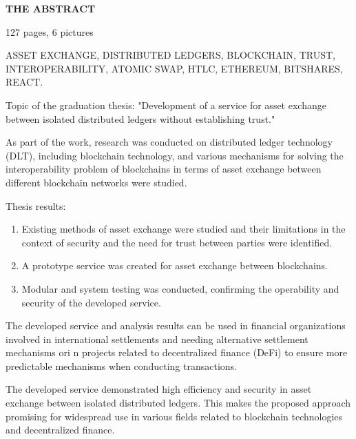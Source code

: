 \begin{center}
\textbf{THE ABSTRACT}
\end{center}
\vspace{4pt}

127 pages, 6 pictures

\noindent ASSET EXCHANGE, DISTRIBUTED LEDGERS, BLOCKCHAIN, TRUST,\\
INTEROPERABILITY, ATOMIC SWAP, HTLC, ETHEREUM, BITSHARES, REACT.

\vspace{4pt}

Topic of the graduation thesis: "Development of a service for asset exchange between isolated distributed ledgers without establishing trust."

As part of the work, research was conducted on distributed ledger technology (DLT), including blockchain technology, and various mechanisms for solving the interoperability problem of blockchains in terms of asset exchange between different blockchain networks were studied.

Thesis results:
\begin{enumerate}
\item Existing methods of asset exchange were studied and their limitations in the context of security and the need for trust between parties were identified.
\item A prototype service was created for asset exchange between blockchains.
\item Modular and system testing was conducted, confirming the operability and security of the developed service.
\end{enumerate}

The developed service and analysis results can be used in financial organizations involved in international settlements and needing alternative settlement mechanisms ori n projects related to decentralized finance (DeFi) to ensure more predictable mechanisms when conducting transactions.

The developed service demonstrated high efficiency and security in asset exchange between isolated distributed ledgers. This makes the proposed approach promising for widespread use in various fields related to blockchain technologies and decentralized finance.

\newpage